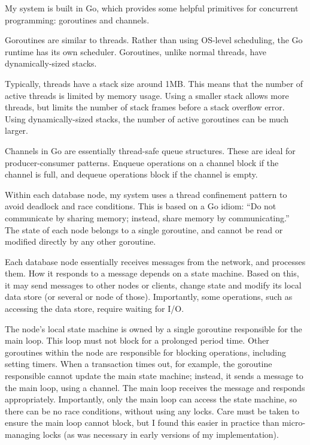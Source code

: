 \documentclass[12pt,a4paper,twoside,openany]{report}
\begin{document}
My system is built in Go, which provides some helpful primitives for concurrent programming: goroutines and channels.

Goroutines are similar to threads. Rather than using OS-level scheduling, the Go runtime has its own scheduler. Goroutines, unlike normal threads, have dynamically-sized stacks.

Typically, threads have a stack size around 1MB. This means that the number of active threads is limited by memory usage. Using a smaller stack allows more threads, but limits the number of stack frames before a stack overflow error. Using dynamically-sized stacks, the number of active goroutines can be much larger.

Channels in Go are essentially thread-safe queue structures. These are ideal for producer-consumer patterns. Enqueue operations on a channel block if the channel is full, and dequeue operations block if the channel is empty.

Within each database node, my system uses a thread confinement pattern to avoid deadlock and race conditions. This is based on a Go idiom: ``Do not communicate by sharing memory; instead, share memory by communicating.'' \cite{effective} The state of each node belongs to a single goroutine, and cannot be read or modified directly by any other goroutine.

Each database node essentially receives messages from the network, and processes them. How it responds to a message depends on a state machine. Based on this, it may send messages to other nodes or clients, change state and modify its local data store (or several or node of those). Importantly, some operations, such as accessing the data store, require waiting for I/O.

The node's local state machine is owned by a single goroutine responsible for the main loop. This loop must not block for a prolonged period time. Other goroutines within the node are responsible for blocking operations, including setting timers. When a transaction times out, for example, the goroutine responsible cannot update the main state machine; instead, it sends a message to the main loop, using a channel. The main loop receives the message and responds appropriately. Importantly, only the main loop can access the state machine, so there can be no race conditions, without using any locks. Care must be taken to ensure the main loop cannot block, but I found this easier in practice than micro-managing locks (as was necessary in early versions of my implementation).
\end{document}
